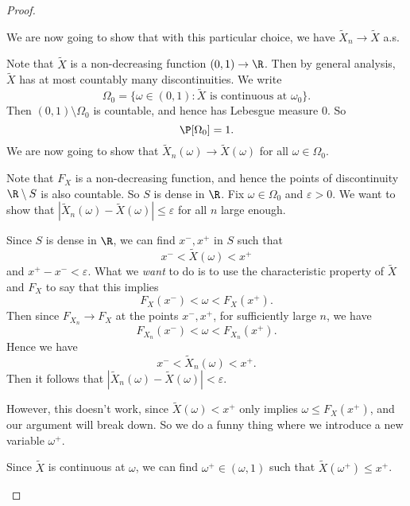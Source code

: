 \documentclass[a4paper]{article}
\begin{document}
\begin{proof}
\begin{enumerate}
       We are now going to show that with this particular choice, we have $\tilde{X}_n \to \tilde{X}$ a.s.

       Note that $\tilde{X}$ is a non-decreasing function $(0, 1) \to \R$. Then by general analysis, $\tilde{X}$ has at most countably many discontinuities. We write
       \[
         \Omega_0 = \{\omega \in (0, 1): \tilde{X}\text{ is continuous at }\omega_0\}.
       \]
       Then $(0, 1) \setminus \Omega_0$ is countable, and hence has Lebesgue measure $0$. So
       \[
         \P[\Omega_0] = 1.
       \]
       We are now going to show that $\tilde{X}_n (\omega) \to \tilde{X}(\omega)$ for all $\omega \in \Omega_0$.

       Note that $F_X$ is a non-decreasing function, and hence the points of discontinuity $\R \setminus S$ is also countable. So $S$ is dense in $\R$. Fix $\omega \in \Omega_0$ and $\varepsilon > 0$. We want to show that $|\tilde{X}_n(\omega) - \tilde{X}(\omega)| \leq \varepsilon$ for all $n$ large enough.

       Since $S$ is dense in $\R$, we can find $x^-, x^+$ in $S$ such that
       \[
         x^- < \tilde{X}(\omega) < x^+
       \]
       and $x^+ - x^- < \varepsilon$. What we \emph{want} to do is to use the characteristic property of $\tilde{X}$ and $F_X$ to say that this implies
       \[
         F_X(x^-) < \omega < F_X(x^+).
       \]
       Then since $F_{X_n} \to F_X$ at the points $x^-, x^+$, for sufficiently large $n$, we have
       \[
         F_{X_n}(x^-) < \omega < F_{X_n}(x^+).
       \]
       Hence we have
       \[
         x^- < \tilde{X}_n(\omega) < x^+.
       \]
       Then it follows that $|\tilde{X}_n(\omega) - \tilde{X}(\omega)| < \varepsilon$.

       However, this doesn't work, since $\tilde{X}(\omega) < x^+$ only implies $\omega \leq F_X(x^+)$, and our argument will break down. So we do a funny thing where we introduce a new variable $\omega^+$.

       Since $\tilde{X}$ is continuous at $\omega$, we can find $\omega^+\in (\omega, 1)$ such that $\tilde{X}(\omega^+) \leq x^+$.
       \begin{center}
\end{center}
\end{enumerate}
\end{proof}
\end{document}
